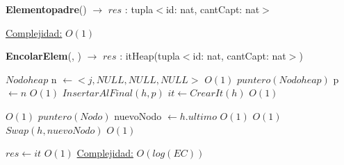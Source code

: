 \begin{Algoritmos}
\begin{algorithm}[H]{\textbf{Elementopadre}() $\to$ $res$ : tupla$<$id: nat, cantCapt: nat$>$}
\begin{algorithmic}[1]
			\medskip
			\Statex \underline{Complejidad:} $O(1)$
    	\end{algorithmic}   	
\end{algorithm}

\begin{algorithm}[H]{\textbf{EncolarElem}(, ) $\to$ $res$ : itHeap(tupla$<$id: nat, cantCapt: nat$>$)}
    	\begin{algorithmic}[1]
    	\State $Nodoheap$ n $\gets <j, NULL, NULL, NULL>$ \Comment $O(1)$
    	\State $puntero(Nodoheap)$ p $\gets n$  \Comment $O(1)$
		\State $InsertarAlFinal(h, p)$
		\State $it \gets CrearIt(h)$ \Comment $O(1)$

		 \Comment $O(1)$
			\State $puntero(Nodo)$ nuevoNodo $\gets h.ultimo$			\Comment $O(1)$
			 \Comment $O(1)$
				\State $Swap(h, nuevoNodo)$ \Comment $O(1)$
						
			\EndWhile
		\EndIf
		\State $res \gets it$ \Comment $O(1)$
			\medskip
			\Statex \underline{Complejidad:} $O(log(EC))$
    	\end{algorithmic}   	
\end{algorithm}


\end{Algoritmos}
